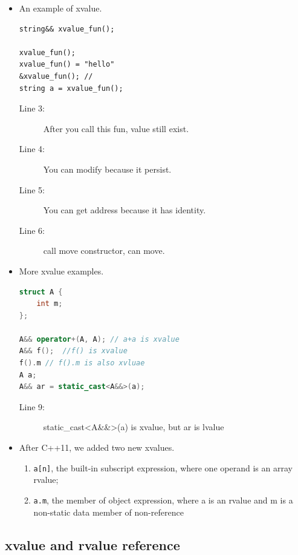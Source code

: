 \documentclass[a4paper,11pt,twoside]{book}
\begin{document}
\begin{itemize}
	

\item An example of xvalue.
\begin{lstlisting}
string&& xvalue_fun();

xvalue_fun(); 
xvalue_fun() = "hello" 
&xvalue_fun(); //
string a = xvalue_fun(); 
\end{lstlisting}
\begin{description}
	\item[Line 3:] After you call this fun, value still exist.
	\item[Line 4:] You can modify because it persist.
	\item[Line 5:] You can get address because it has identity.
	\item[Line 6:] call move constructor, can move.
\end{description}

	

	
	\item More xvalue examples.
\begin{lstlisting}[frame=single, language=c++, mathescape=true]
struct A {
	int m;
};
	
A&& operator+(A, A); // a+a is xvalue
A&& f();  //f() is xvalue
f().m // f().m is also xvluae
A a;
A&& ar = static_cast<A&&>(a);
\end{lstlisting}
\begin{description}
	\item[Line 9:] static\_cast<A\&\&>(a) is xvalue, but ar is lvalue
\end{description}
	
	\item After C++11, we added two new xvalues.
	\begin{enumerate}
		\item \texttt{a[n]}, the built-in subscript expression, where one operand is an array rvalue;
		\item \texttt{a.m}, the member of object expression, where a is an rvalue and m is a non-static data member of non-reference
	\end{enumerate}
\end{itemize}

\subsection{xvalue and rvalue reference}
\end{document}
